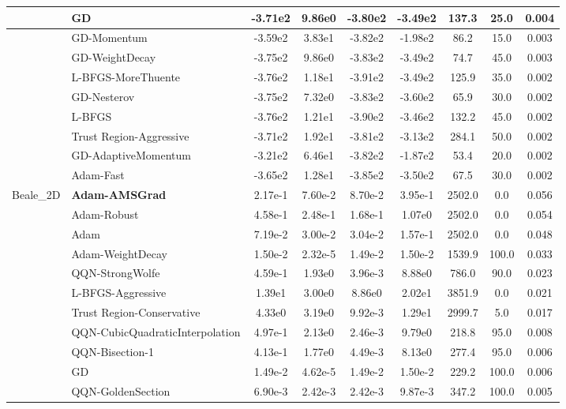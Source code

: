 \documentclass{article}
\begin{document}
\begin{longtable}{|l|l|c|c|c|c|c|c|c|}
\hline
 & GD & -3.71e2 & 9.86e0 & -3.80e2 & -3.49e2 & 137.3 & 25.0 & 0.004 \\
\hline
 & GD-Momentum & -3.59e2 & 3.83e1 & -3.82e2 & -1.98e2 & 86.2 & 15.0 & 0.003 \\
\hline
 & GD-WeightDecay & -3.75e2 & 9.86e0 & -3.83e2 & -3.49e2 & 74.7 & 45.0 & 0.003 \\
\hline
 & L-BFGS-MoreThuente & -3.76e2 & 1.18e1 & -3.91e2 & -3.49e2 & 125.9 & 35.0 & 0.002 \\
\hline
 & GD-Nesterov & -3.75e2 & 7.32e0 & -3.83e2 & -3.60e2 & 65.9 & 30.0 & 0.002 \\
\hline
 & L-BFGS & -3.76e2 & 1.21e1 & -3.90e2 & -3.46e2 & 132.2 & 45.0 & 0.002 \\
\hline
 & Trust Region-Aggressive & -3.71e2 & 1.92e1 & -3.81e2 & -3.13e2 & 284.1 & 50.0 & 0.002 \\
\hline
 & GD-AdaptiveMomentum & -3.21e2 & 6.46e1 & -3.82e2 & -1.87e2 & 53.4 & 20.0 & 0.002 \\
\hline
 & Adam-Fast & -3.65e2 & 1.28e1 & -3.85e2 & -3.50e2 & 67.5 & 30.0 & 0.002 \\
Beale\_2D & \textbf{Adam-AMSGrad} & 2.17e-1 & 7.60e-2 & 8.70e-2 & 3.95e-1 & 2502.0 & 0.0 & 0.056 \\
\hline
 & Adam-Robust & 4.58e-1 & 2.48e-1 & 1.68e-1 & 1.07e0 & 2502.0 & 0.0 & 0.054 \\
\hline
 & Adam & 7.19e-2 & 3.00e-2 & 3.04e-2 & 1.57e-1 & 2502.0 & 0.0 & 0.048 \\
\hline
 & Adam-WeightDecay & 1.50e-2 & 2.32e-5 & 1.49e-2 & 1.50e-2 & 1539.9 & 100.0 & 0.033 \\
\hline
 & QQN-StrongWolfe & 4.59e-1 & 1.93e0 & 3.96e-3 & 8.88e0 & 786.0 & 90.0 & 0.023 \\
\hline
 & L-BFGS-Aggressive & 1.39e1 & 3.00e0 & 8.86e0 & 2.02e1 & 3851.9 & 0.0 & 0.021 \\
\hline
 & Trust Region-Conservative & 4.33e0 & 3.19e0 & 9.92e-3 & 1.29e1 & 2999.7 & 5.0 & 0.017 \\
\hline
 & QQN-CubicQuadraticInterpolation & 4.97e-1 & 2.13e0 & 2.46e-3 & 9.79e0 & 218.8 & 95.0 & 0.008 \\
\hline
 & QQN-Bisection-1 & 4.13e-1 & 1.77e0 & 4.49e-3 & 8.13e0 & 277.4 & 95.0 & 0.006 \\
\hline
 & GD & 1.49e-2 & 4.62e-5 & 1.49e-2 & 1.50e-2 & 229.2 & 100.0 & 0.006 \\
\hline
 & QQN-GoldenSection & 6.90e-3 & 2.42e-3 & 2.42e-3 & 9.87e-3 & 347.2 & 100.0 & 0.005 \\

\end{longtable}
\end{document}
